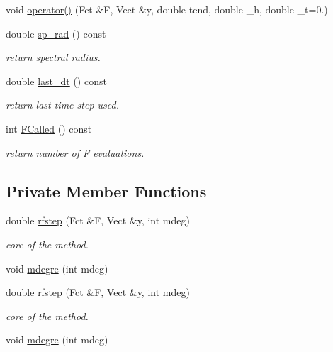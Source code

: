\begin{DoxyCompactItemize}
void \hyperlink{classrock4_a349ce369e33642b556588d129160f5ce}{operator()} (Fct \&F, Vect \&y, double tend, double \-\_\-h, double \-\_\-t=0.)
\item 
double \hyperlink{classrock4_aee7ec6f366b3e1ebc29eb068594cd78e}{sp\-\_\-rad} () const 
\begin{DoxyCompactList}\small\item\em return spectral radius. \end{DoxyCompactList}\item 
double \hyperlink{classrock4_ab04915ddabed22f7a4e923cecf7638d5}{last\-\_\-dt} () const 
\begin{DoxyCompactList}\small\item\em return last time step used. \end{DoxyCompactList}\item 
int \hyperlink{classrock4_acaaae2f64bfc0f2ecedcb0df3c9659a6}{F\-Called} () const 
\begin{DoxyCompactList}\small\item\em return number of F evaluations. \end{DoxyCompactList}\end{DoxyCompactItemize}
\subsection*{Private Member Functions}
\begin{DoxyCompactItemize}
\item 
double \hyperlink{classrock4_a497e043eed0699f89929d434c7682861}{rfstep} (Fct \&F, Vect \&y, int mdeg)
\begin{DoxyCompactList}\small\item\em core of the method. \end{DoxyCompactList}\item 
void \hyperlink{classrock4_a80d4f63b74e4cebf8bc5694917ecb01e}{mdegre} (int mdeg)
\item 
double \hyperlink{classrock4_a497e043eed0699f89929d434c7682861}{rfstep} (Fct \&F, Vect \&y, int mdeg)
\begin{DoxyCompactList}\small\item\em core of the method. \end{DoxyCompactList}\item 
void \hyperlink{classrock4_a80d4f63b74e4cebf8bc5694917ecb01e}{mdegre} (int mdeg)
\end{DoxyCompactItemize}
